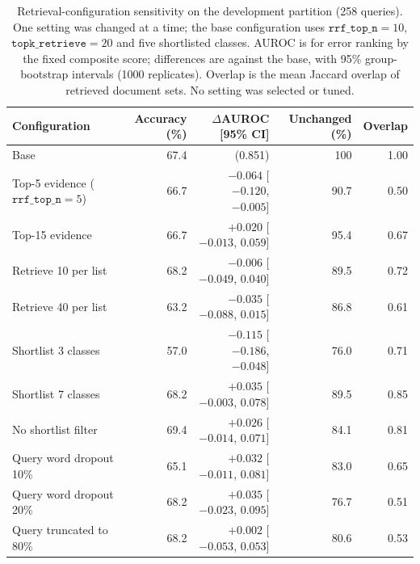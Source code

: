 \begin{table}[t]
\centering
\caption{Retrieval-configuration sensitivity on the development partition (258 queries). One setting was changed at a time; the base configuration uses $\texttt{rrf\_top\_n}=10$, $\texttt{topk\_retrieve}=20$ and five shortlisted classes. AUROC is for error ranking by the fixed composite score; differences are against the base, with 95\% group-bootstrap intervals (1000 replicates). Overlap is the mean Jaccard overlap of retrieved document sets. No setting was selected or tuned.}
\label{tab:sensitivity}
\small
\begin{tabular}{lrrrr}
\toprule
Configuration & Accuracy (\%) & $\Delta$AUROC [95\% CI] & Unchanged (\%) & Overlap \\
\midrule
Base & 67.4 & (0.851) & 100 & 1.00 \\
Top-5 evidence ($\texttt{rrf\_top\_n}=5$) & 66.7 & $-0.064$ [$-0.120$, $-0.005$] & 90.7 & 0.50 \\
Top-15 evidence & 66.7 & $+0.020$ [$-0.013$, $0.059$] & 95.4 & 0.67 \\
Retrieve 10 per list & 68.2 & $-0.006$ [$-0.049$, $0.040$] & 89.5 & 0.72 \\
Retrieve 40 per list & 63.2 & $-0.035$ [$-0.088$, $0.015$] & 86.8 & 0.61 \\
Shortlist 3 classes & 57.0 & $-0.115$ [$-0.186$, $-0.048$] & 76.0 & 0.71 \\
Shortlist 7 classes & 68.2 & $+0.035$ [$-0.003$, $0.078$] & 89.5 & 0.85 \\
No shortlist filter & 69.4 & $+0.026$ [$-0.014$, $0.071$] & 84.1 & 0.81 \\
Query word dropout 10\% & 65.1 & $+0.032$ [$-0.011$, $0.081$] & 83.0 & 0.65 \\
Query word dropout 20\% & 68.2 & $+0.035$ [$-0.023$, $0.095$] & 76.7 & 0.51 \\
Query truncated to 80\% & 68.2 & $+0.002$ [$-0.053$, $0.053$] & 80.6 & 0.53 \\
\bottomrule
\end{tabular}
\end{table}
